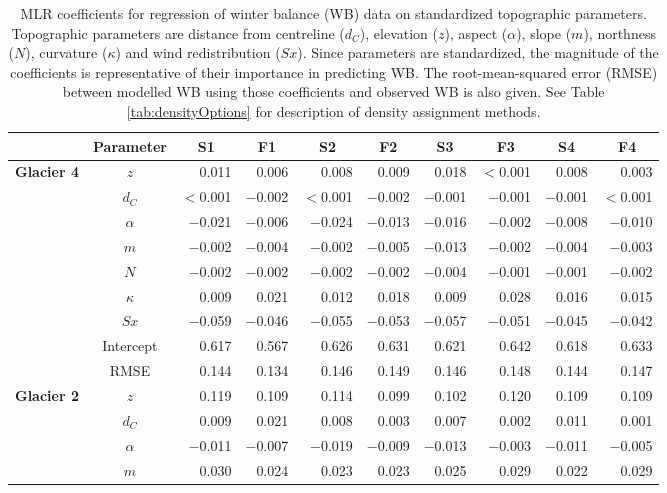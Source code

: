 \documentclass{sfuthesis}
\newcommand{\params}{Topographic parameters are distance from centreline ($d_C$), elevation ($z$), aspect ($\alpha$), slope ($m$), northness ($N$), curvature ($\kappa$) and wind redistribution ($Sx$). }
\begin{document}
\begin{table}
\footnotesize
\centering
\caption{MLR coefficients for regression of winter balance (WB) data on standardized topographic parameters. \params  Since parameters are standardized, the magnitude of the coefficients is representative of their importance in predicting WB. The root-mean-squared error (RMSE) between modelled WB using those coefficients and observed WB is also given. See Table \ref{tab:densityOptions} for description of density assignment methods.}
\label{tab:MLRcoeffFull}
\begin{tabular}{ccrrrrrrrr}
 & \textbf{Parameter} & \multicolumn{1}{c}{\textbf{S1}} & \multicolumn{1}{c}{\textbf{F1}} & \multicolumn{1}{c}{\textbf{S2}} & \multicolumn{1}{c}{\textbf{F2}} & \multicolumn{1}{c}{\textbf{S3}} & \multicolumn{1}{c}{\textbf{F3}} & \multicolumn{1}{c}{\textbf{S4}} & \multicolumn{1}{c}{\textbf{F4}} \\ \hline \hline
\multirow{9}{*}{\textbf{Glacier 4}} & $z$ & 0.011 & 0.006 & 0.008 & 0.009 & 0.018 & $<$0.001 & 0.008 & 0.003 \\
 & $d_C$ & $<$0.001 & $-$0.002 & $<$0.001 & $-$0.002 & $-$0.001 & $-$0.001 & $-$0.001 & $<$0.001 \\
 & $\alpha$ & $-$0.021 & $-$0.006 & $-$0.024 & $-$0.013 & $-$0.016 & $-$0.002 & $-$0.008 & $-$0.010 \\
 & $m$ & $-$0.002 & $-$0.004 & $-$0.002 & $-$0.005 & $-$0.013 & $-$0.002 & $-$0.004 & $-$0.003 \\
 & $N$ & $-$0.002 & $-$0.002 & $-$0.002 & $-$0.002 & $-$0.004 & $-$0.001 & $-$0.001 & $-$0.002 \\
 & $\kappa$ & 0.009 & 0.021 & 0.012 & 0.018 & 0.009 & 0.028 & 0.016 & 0.015 \\
 & $Sx$ & $-$0.059 & $-$0.046 & $-$0.055 & $-$0.053 & $-$0.057 & $-$0.051 & $-$0.045 & $-$0.042 \\
 & Intercept & 0.617 & 0.567 & 0.626 & 0.631 & 0.621 & 0.642 & 0.618 & 0.633 \\
 & RMSE & 0.144 & 0.134 & 0.146 & 0.149 & 0.146 & 0.148 & 0.144 & 0.147 \\ \hline
\multirow{9}{*}{\textbf{Glacier 2}} & $z$ & 0.119 & 0.109 & 0.114 & 0.099 & 0.102 & 0.120 & 0.109 & 0.109 \\
 & $d_C$ & 0.009 & 0.021 & 0.008 & 0.003 & 0.007 & 0.002 & 0.011 & 0.001 \\
 & $\alpha$ & $-$0.011 & $-$0.007 & $-$0.019 & $-$0.009 & $-$0.013 & $-$0.003 & $-$0.011 & $-$0.005 \\
 & $m$ & 0.030 & 0.024 & 0.023 & 0.023 & 0.025 & 0.029 & 0.022 & 0.029 \\

\end{tabular}
\end{table}
\end{document}
